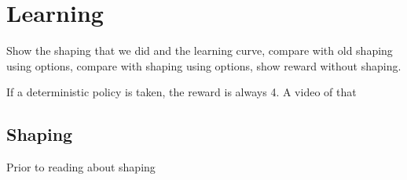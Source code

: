 %
%
%
%
%
%
%
%
%
%
%
%
%
%
%
%
%

\section{Learning}
Show the shaping that we did and the learning curve, compare with old shaping
using options, compare with shaping using options, show reward without shaping.

If a deterministic policy is taken, the reward is always 4. A video of that 


\subsection{Shaping\label{subsec:evaluation-shaping}}

Prior to reading about shaping

